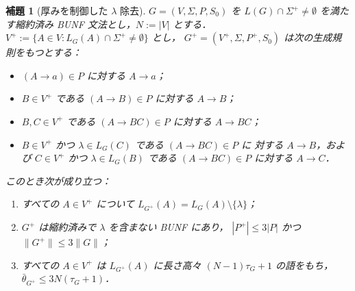 \documentclass[11pt,a4paper]{ltjsarticle}
\numberwithin{equation}{section}
\theoremstyle{plain}
\newtheorem{lemma}[theorem]{補題}
\theoremstyle{definition}
\theoremstyle{remark}
\theoremstyle{plain}
\begin{document}
\begin{lemma}[厚みを制御した $\lambda$ 除去]
\label{lem:lambda-elimination}
$G=(V,\Sigma,P,S_0)$ を $L(G)\cap\Sigma^+\ne\emptyset$ を満たす縮約済み
BUNF 文法とし，$N:=|V|$ とする．
$V^+:=\{A\in V:L_G(A)\cap\Sigma^+\ne\emptyset\}$ とし，
$G^+=(V^+,\Sigma,P^+,S_0)$ は次の生成規則をもつとする：
\begin{itemize}[leftmargin=*,nosep]
\item $(A\to a)\in P$ に対する $A\to a$；
\item $B\in V^+$ である $(A\to B)\in P$ に対する $A\to B$；
\item $B,C\in V^+$ である $(A\to BC)\in P$ に対する $A\to BC$；
\item $B\in V^+$ かつ $\lambda\in L_G(C)$ である $(A\to BC)\in P$ に
対する $A\to B$，および $C\in V^+$ かつ $\lambda\in L_G(B)$ である
$(A\to BC)\in P$ に対する $A\to C$．
\end{itemize}
このとき次が成り立つ：
\begin{enumerate}[label=\textup{(\roman*)},leftmargin=*]
\item すべての $A\in V^+$ について $L_{G^+}(A)=L_G(A)\setminus\{\lambda\}$；
\item $G^+$ は縮約済みで $\lambda$ を含まない BUNF にあり，
$|P^+|\le3|P|$ かつ $\|G^+\|\le3\|G\|$；
\item すべての $A\in V^+$ は $L_{G^+}(A)$ に長さ高々
$(N-1)\tau_G+1$ の語をもち，$\bar\theta_{G^+}\le3N(\tau_G+1)$．
\end{enumerate}
\end{lemma}
\end{document}
